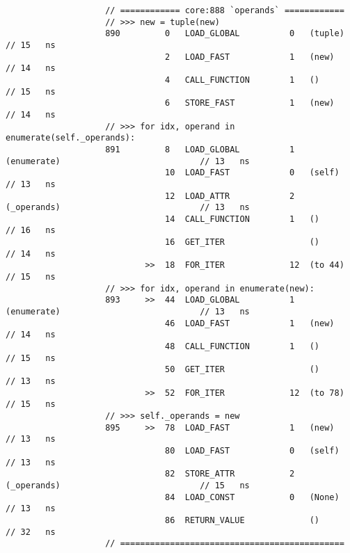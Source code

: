 \begin{code}
\begin{verbatim}
                    // ============ core:888 `operands` ============
                    // >>> new = tuple(new)
                    890         0   LOAD_GLOBAL          0   (tuple)                                // 15   ns
                                2   LOAD_FAST            1   (new)                                  // 14   ns
                                4   CALL_FUNCTION        1   ()                                     // 15   ns
                                6   STORE_FAST           1   (new)                                  // 14   ns
                    // >>> for idx, operand in enumerate(self._operands):
                    891         8   LOAD_GLOBAL          1   (enumerate)                            // 13   ns
                                10  LOAD_FAST            0   (self)                                 // 13   ns
                                12  LOAD_ATTR            2   (_operands)                            // 13   ns
                                14  CALL_FUNCTION        1   ()                                     // 16   ns
                                16  GET_ITER                 ()                                     // 14   ns
                            >>  18  FOR_ITER             12  (to 44)                                // 15   ns
                    // >>> for idx, operand in enumerate(new):
                    893     >>  44  LOAD_GLOBAL          1   (enumerate)                            // 13   ns
                                46  LOAD_FAST            1   (new)                                  // 14   ns
                                48  CALL_FUNCTION        1   ()                                     // 15   ns
                                50  GET_ITER                 ()                                     // 13   ns
                            >>  52  FOR_ITER             12  (to 78)                                // 15   ns
                    // >>> self._operands = new
                    895     >>  78  LOAD_FAST            1   (new)                                  // 13   ns
                                80  LOAD_FAST            0   (self)                                 // 13   ns
                                82  STORE_ATTR           2   (_operands)                            // 15   ns
                                84  LOAD_CONST           0   (None)                                 // 13   ns
                                86  RETURN_VALUE             ()                                     // 32   ns
                    // =============================================


\end{verbatim}
\end{code}
